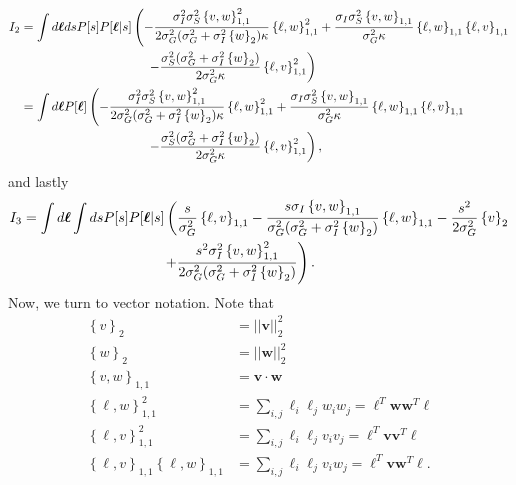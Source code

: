 \documentclass[11pt]{article}
\begin{document}
\begin{align}
	I_2 &= \int d\boldsymbol{\ell} ds P[s] P[\boldsymbol{\ell}|s] \left(-\frac{\sigma_I^2 \sigma_S^2 \left\{v,w\right\}_{1,1}^2}{2 \sigma_G^2(\sigma_G^2 + \sigma_I^2 \left\{w\right\}_2) \kappa} \left\{\ell, w\right\}_{1,1}^2 + \frac{\sigma_I \sigma_S^2\left\{v,w\right\}_{1,1}}{\sigma_G^2\kappa} \left\{\ell, w\right\}_{1,1} \left\{\ell, v\right\}_{1,1}\right. \notag \\
	&\left. \qquad \qquad \qquad \qquad \qquad  -\frac{\sigma_S^2 (\sigma_G^2 + \sigma_I^2 \left\{w\right\}_2)}{2 \sigma_G^2 \kappa} \left\{\ell, v\right\}_{1,1}^2 \right) \\
	&= \int d\boldsymbol{\ell} P[\boldsymbol{\ell}] \left(-\frac{\sigma_I^2 \sigma_S^2 \left\{v,w\right\}_{1,1}^2}{2 \sigma_G^2(\sigma_G^2 + \sigma_I^2 \left\{w\right\}_2) \kappa} \left\{\ell, w\right\}_{1,1}^2 + \frac{\sigma_I \sigma_S^2\left\{v,w\right\}_{1,1}}{\sigma_G^2\kappa} \left\{\ell, w\right\}_{1,1} \left\{\ell, v\right\}_{1,1}\right. \notag \\
	&\left. \qquad \qquad \qquad \qquad \qquad  -\frac{\sigma_S^2 (\sigma_G^2 + \sigma_I^2 \left\{w\right\}_2)}{2 \sigma_G^2 \kappa} \left\{\ell, v\right\}_{1,1}^2 \right),
\end{align}
and lastly 
\begin{align}
	I_3 &= \int d\boldsymbol{\ell} \int ds P[s] P[\boldsymbol{\ell}|s] \left(\frac{s}{\sigma_G^2} \left\{\ell, v\right\}_{1,1} - \frac{s \sigma_I \left\{v,w\right\}_{1,1}}{\sigma_G^2 (\sigma_G^2 + \sigma_I^2 \left\{w\right\}_2)}\left\{\ell, w\right\}_{1,1} - \frac{s^2}{2\sigma_G^2} \left\{v\right\}_2 \right. \notag \\
	&\qquad  \qquad \qquad \qquad \qquad \left. + \frac{s^2 \sigma_I^2 \left\{v,w\right\}_{1,1}^2}{2\sigma_G^2 (\sigma_G^2 + \sigma_I^2 \left\{w\right\}_2)}\right).
\end{align}
Now, we turn to vector notation. Note that 
\begin{align}
\left\{v\right\}_2 &= ||\mathbf{v}||^2_2 \\
\left\{w\right\}_2 &= ||\mathbf{w}||^2_2 \\
\left\{v,w\right\}_{1,1} &= \mathbf{v}\cdot \mathbf{w}\\
\left\{\ell, w\right\}_{1,1}^2 &= \sum_{i,j} \ell_i \ell_j w_i w_j = \boldsymbol{\ell}^T \mathbf{ww}^T \boldsymbol{\ell} \\
\left\{\ell, v\right\}_{1,1}^2 &= \sum_{i,j} \ell_i \ell_j  v_i v_j = \boldsymbol{\ell}^T \mathbf{vv}^T \boldsymbol{\ell} \\
\left\{\ell, v\right\}_{1,1} \left\{\ell,w\right\}_{1,1}&= \sum_{i,j} \ell_i \ell_j v_i w_j= \boldsymbol{\ell}^T \mathbf{vw}^T \boldsymbol{\ell}.
\end{align}
\end{document}
